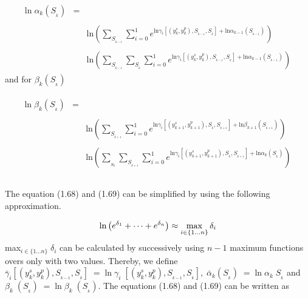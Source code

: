 \begin{eqnarray}
\begin{array}{lll}
\mathrm{ln}\;\alpha_k(S_{_{k}})&=& \\ \\
&&\mathrm{ln}\left(\sum\limits_{S_{_{k-1}}}\sum\limits_{i=0}^{1}e^{\mathrm{ln}\gamma_i\left[\left(y_k^s,y_k^p\right),S_{_{k-1}},S_{_{k}}\right]+\mathrm{ln}\alpha_{k-1}\left(S_{_{k-1}}\right)}\right) \\ \\
&&\mathrm{ln}\left(\sum\limits_{S_{_{k-1}}}\sum\limits_{S_{_{k}}}\sum\limits_{i=0}^{1}e^{\mathrm{ln}\gamma_i\left[\left(y_k^s,y_k^p\right),S_{_{k-1}},S_{_{k}}\right]+\mathrm{ln}\alpha_{k-1}\left(S_{_{k-1}}\right)}\right) 
\end{array}
\end{eqnarray}
and for $\beta_k(S_{_{k}})$

\begin{eqnarray}
\begin{array}{lll}
\mathrm{ln}\;\beta_k(S_{_{k}})&=& \\ \\
&&\mathrm{ln}\left(\sum\limits_{S_{_{k+1}}}\sum\limits_{i=0}^{1}e^{\mathrm{ln}\gamma_i\left[\left(y_{k+1}^s,y_{k+1}^p\right),S_{_{k}},S_{_{k+1}}\right]+\mathrm{ln}\beta_{k+1}\left(S_{_{k+1}}\right)}\right) \\ \\
&&\mathrm{ln}\left(\sum\limits_{_{S_{k}}}\sum\limits_{S_{_{k+1}}}\sum\limits_{i=0}^{1}e^{\mathrm{ln}\gamma_i\left[\left(y_{k+1}^s,y_{k+1}^p\right),S_{_{k}},S_{_{k+1}}\right]+\mathrm{ln}\alpha_{k}\left(S_{_{k}}\right)}\right) \\ \\
\end{array}
\end{eqnarray}

The equation (1.68) and (1.69) can be simplified by using the following approximation.

\begin{equation}
\mathrm{ln}\left(e^{\delta_1}+\cdots + e^{\delta_n}\right)\approx \max_{i\small{\in} \{1\dots n\}}\delta_i
\end{equation}
max$_{i\in\{1\dots n\}}\;\delta_i$ can be calculated by successively using $n-1$ maximum functions overs only with two values. Thereby, we define $\bar{\gamma}_i\left[\left(y_k^s,y_k^p\right),S_{_{k-1}},S_{_{k}}\right]\;=\;\mathrm{ln}\;\gamma_i\;\left[\left(y_k^s,y_k^p\right),S_{_{k-1}},S_{_{k}}\right],\;\bar{\alpha}_k(S_{_{k}})\;=\;\mathrm{ln}\;\alpha_k\;S_{_{k}}$ and $\beta_k\;(S_{_{k}})\;=\;\mathrm{ln}\;\beta_k\;(S_{_{k}})$. The equations (1.68) and (1.69) can be written as

